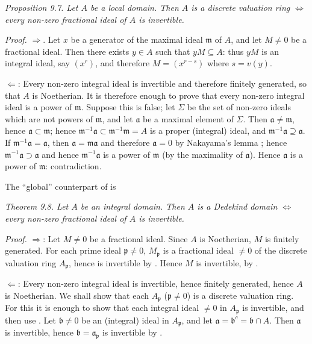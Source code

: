 \noindent\textit{Proposition 9.7. Let $A$ be a local domain. Then $A$ is a discrete valuation ring $\Longleftrightarrow$ every non-zero fractional ideal of $A$ is invertible.}

\noindent\textit{Proof.} $\Rightarrow$. Let $x$ be a generator of the maximal ideal $\mathfrak m$ of $A$, and let $M\neq0$ be a fractional ideal. Then there exists $y\in A$ such that $yM\subseteq A$: thus $yM$ is an integral ideal, say $(x^r)$, and therefore $M=(x^{r-s})$ where $s=v(y)$.

$\Leftarrow$: Every non-zero integral ideal is invertible and therefore finitely generated, so that $A$ is Noetherian. It is therefore enough to prove that every non-zero integral ideal is a power of $\mathfrak m$. Suppose this is false; let $\Sigma$ be the set of non-zero ideals which are not powers of $\mathfrak m$, and let $\mathfrak a$ be a maximal element of $\Sigma$. Then $\mathfrak a\neq\mathfrak m$, hence $\mathfrak a\subset\mathfrak m$; hence $\mathfrak m^{-1}\mathfrak a\subset\mathfrak m^{-1}\mathfrak m=A$ is a proper (integral) ideal, and $\mathfrak m^{-1}\mathfrak a\supseteq\mathfrak a$. If $\mathfrak m^{-1}\mathfrak a=\mathfrak a$, then $\mathfrak a=\mathfrak m\mathfrak a$ and therefore $\mathfrak a=0$ by Nakayama's lemma ; hence $\mathfrak m^{-1}\mathfrak a\supset\mathfrak a$ and hence $\mathfrak m^{-1}\mathfrak a$ is a power of $\mathfrak m$ (by the maximality of $\mathfrak a$). Hence $\mathfrak a$ is a power of $\mathfrak m$: contradiction. \proofbox

The ``global'' counterpart of  is

\noindent\textit{Theorem 9.8. Let $A$ be an integral domain. Then $A$ is a Dedekind domain $\Longleftrightarrow$ every non-zero fractional ideal of $A$ is invertible.}

\noindent\textit{Proof.} $\Rightarrow$: Let $M\neq0$ be a fractional ideal. Since $A$ is Noetherian, $M$ is finitely generated. For each prime ideal $\mathfrak p\neq0$, $M_{\mathfrak p}$ is a fractional ideal $\neq0$ of the discrete valuation ring $A_{\mathfrak p}$, hence is invertible by . Hence $M$ is invertible, by .

$\Leftarrow$: Every non-zero integral ideal is invertible, hence finitely generated, hence $A$ is Noetherian. We shall show that each $A_{\mathfrak p}$ ($\mathfrak p\neq0$) is a discrete valuation ring. For this it is enough to show that each integral ideal $\neq0$ in $A_{\mathfrak p}$ is invertible, and then use . Let $\mathfrak b\neq0$ be an (integral) ideal in $A_{\mathfrak p}$, and let $\mathfrak a=\mathfrak b^c=\mathfrak b\cap A$. Then $\mathfrak a$ is invertible, hence $\mathfrak b=\mathfrak a_{\mathfrak p}$ is invertible by . \proofbox

